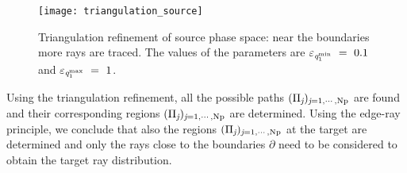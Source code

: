 \begin{figure}[h]
  \begin{center}
  \texttt{[image: triangulation\_source]}
  \end{center}
  \caption{Triangulation refinement of source phase space:
  near the boundaries more rays are traced.
    The values of the parameters are $\varepsilon_{\textit{q}_1^\textrm{min}}~=~ 0.1$ and $\varepsilon_{\textit{q}_1^\textrm{max}}~=~1$.}
   \label{fig:triangulation_refinement}
  \end{figure}
Using the triangulation refinement, all the possible paths $(\Pi_{\textit{j}})_{\textit{j} = 1, \cdots, \textrm{Np}}$ are found and their corresponding regions $(\Pi_{\textit{j}})_{\textit{j} = 1, \cdots, \textrm{Np}}$ are determined. Using the edge-ray principle, we conclude that also the regions $(\Pi_{\textit{j}})_{\textit{j} = 1, \cdots, \textrm{Np}}$ at the target are determined and only the rays close to the boundaries
$\partial$ need to be considered to obtain the target ray distribution.

